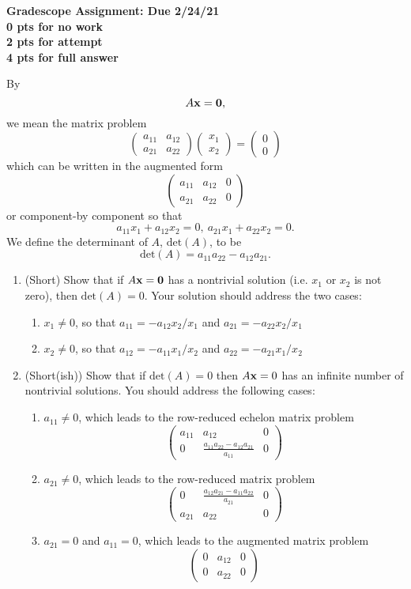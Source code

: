 \documentclass[a4paper,11pt]{article}
\newcommand{\ba}{\begin{array}}
\newcommand{\ea}{\end{array}}
\newcommand{\bp}{\begin{pmatrix}}
\newcommand{\ep}{\end{pmatrix}}
\begin{document}
\begin{center}
{\bf Gradescope Assignment: Due 2/24/21\\
0 pts for no work\\ 2 pts for attempt\\ 4 pts for full answer}
\end{center}
By
$$
A{\bf x} = {\bf 0},
$$
we mean the matrix problem
$$
\bp a_{11} & a_{12} \\ a_{21} & a_{22}\ep\bp x_{1}\\x_{2} \ep = \bp 0\\ 0 \ep
$$ 
which can be written in the augmented form
$$
\left(
\ba{cc|c}
a_{11} & a_{12} & 0 \\ 
a_{21} & a_{22} & 0 
\ea
\right)
$$
or component-by component so that 
$$
a_{11}x_{1} + a_{12}x_{2} = 0, ~ a_{21}x_{1} + a_{22}x_{2} = 0.
$$
We define the determinant of $A$, $\text{det}(A)$, to be 
$$
\text{det}(A) = a_{11}a_{22} - a_{12}a_{21}.
$$
\begin{enumerate}
\item (Short) Show that if $A{\bf x}={\bf 0}$ has a nontrivial solution (i.e. $x_{1}$ or $x_{2}$ is not zero), then $\text{det}(A)=0$.  Your solution should address the two cases: 
\begin{enumerate}
\item $x_{1}\neq 0$, so that $a_{11}=-a_{12}x_{2}/x_{1}$ and $a_{21}=-a_{22}x_{2}/x_{1}$ 
\item $x_{2}\neq 0$, so that $a_{12}=-a_{11}x_{1}/x_{2}$ and $a_{22}=-a_{21}x_{1}/x_{2}$ 
\end{enumerate}
\item (Short(ish)) Show that if $\text{det}(A)=0$ then $A{\bf x}=0$ has an infinite number of nontrivial solutions.   You should address the following cases:
\begin{enumerate}
\item $a_{11}\neq 0$, which leads to the row-reduced echelon matrix problem 
$$
\left(
\ba{cc|c}
a_{11} & a_{12} & 0 \\ 
0 & \frac{a_{11}a_{22}-a_{12}a_{21}}{a_{11}} & 0 
\ea
\right)
$$

\item $a_{21}\neq 0$, which leads to the row-reduced matrix problem 
$$
\left(
\ba{cc|c}
0 & \frac{a_{12}a_{21}-a_{11}a_{22}}{a_{21}} & 0 \\ 
a_{21} & a_{22} & 0 
\ea
\right)
$$

\item $a_{21} = 0$ and $a_{11} = 0$, which leads to the augmented matrix problem 
$$
\left(
\ba{cc|c}
0 & a_{12} & 0 \\ 
0 & a_{22} & 0 
\ea
\right)
$$

\end{enumerate}

\end{enumerate}
\end{document}
